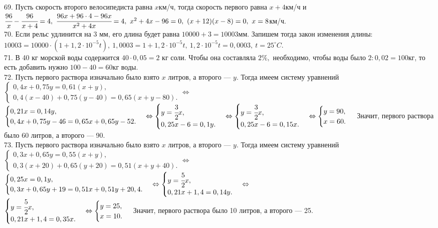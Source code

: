69. Пусть скорость второго велосипедиста равна $x$км/ч, тогда скорость первого равна $x+4$км/ч и $\cfrac{96}{x}-\cfrac{96}{x+4}=4,\ \cfrac{96x+96\cdot4-96x}{x^2+4x}=4,\ x^2+4x-96=0,\ (x+12)(x-8)=0,\ x=8$км/ч.\\
70. Если рельс удлинится на 3 мм, его длина будет равна $10000+3=10003$мм. Запишем тогда закон изменения длины: $10003=10000\cdot(1+1,2\cdot10^{-5}t),\
1,0003=1+1,2\cdot10^{-5}t,\ 1,2\cdot10^{-5}t=0,0003,\ t=25^\circ C.$\\
71. В 40 кг морской воды содержится $40\cdot0,05=2$ кг соли. Чтобы она составляла $2\%,$ необходимо, чтобы воды было $2:0,02=100$кг, то есть добавить нужно $100-40=60$кг воды.\\
72. Пусть первого раствора изначально было взято $x$ литров, а второго --- $y.$ Тогда имеем систему уравнений $\begin{cases} 0,4x+0,75y=0,61(x+y),\\
0,4(x-40)+0,75(y-40)=0,65(x+y-80).\end{cases}\Leftrightarrow$\\$\begin{cases} 0,21x=0,14y,\\
0,4x+0,75y-46=0,65x+0,65y-52.\end{cases}\Leftrightarrow\begin{cases} y=\cfrac{3}{2}x,\\
0,25x-6=0,1y.\end{cases}\Leftrightarrow\begin{cases} y=\cfrac{3}{2}x,\\
0,25x-6=0,15x.\end{cases}\Leftrightarrow\begin{cases} y=90,\\
x=60.\end{cases}$ Значит, первого раствора было 60 литров, а второго --- 90.\\
73. Пусть первого раствора изначально было взято $x$ литров, а второго --- $y.$ Тогда имеем систему уравнений $\begin{cases} 0,3x+0,65y=0,55(x+y),\\
0,3(x+20)+0,65(y+20)=0,51(x+y+40).\end{cases}\Leftrightarrow$\\$\begin{cases} 0,25x=0,1y,\\
0,3x+0,65y+19=0,51x+0,51y+20,4.\end{cases}\Leftrightarrow\begin{cases} y=\cfrac{5}{2}x,\\
0,21x+1,4=0,14y.\end{cases}\Leftrightarrow$\\$\begin{cases} y=\cfrac{5}{2}x,\\
0,21x+1,4=0,35x.\end{cases}\Leftrightarrow\begin{cases} y=25,\\
x=10.\end{cases}$ Значит, первого раствора было 10 литров, а второго --- 25.\\
